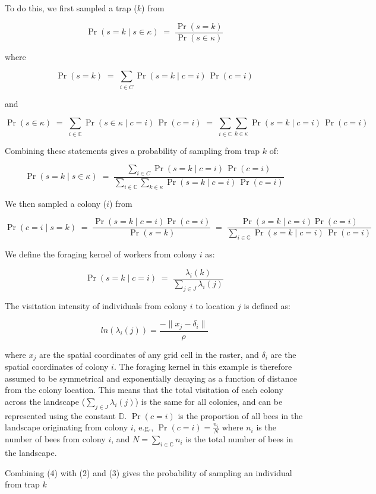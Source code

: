 \documentclass[12pt]{article}
\begin{document}
To do this, we first sampled a trap ($k$) from

\[
\Pr(s = k \mid s \in \kappa) \;=\; \frac{\Pr(s = k)}{\Pr(s \in \kappa)} \tag{1}
\]

where

\[
\Pr(s = k) \;=\; \sum_{i \in C} \Pr(s = k \mid c = i)\,\Pr(c = i)
\]

and

\[
\Pr(s \in \kappa) \;=\; \sum_{i \in \mathbb{C}} \Pr(s \in \kappa \mid c = i)\,\Pr(c = i)
                  \;=\; \sum_{i \in \mathbb{C}} \sum_{k \in \kappa} \Pr(s = k \mid c = i)\,\Pr(c = i)
\]

Combining these statements gives a probability of sampling from trap $k$ of:

\[
\Pr(s = k \mid s \in \kappa) \;=\; \frac{\sum_{i \in C} \Pr(s = k \mid c = i)\,\Pr(c = i)}{\sum_{i \in \mathbb{C}} \sum_{k \in \kappa} \Pr(s = k \mid c = i)\,\Pr(c = i)} \tag{2}
\]

We then sampled a colony ($i$) from

\[
\Pr(c = i \mid s = k) \;=\; \frac{\Pr(s = k \mid c = i) \Pr(c = i)}{\Pr(s = k)} \;=\; \frac{\Pr(s = k \mid c = i) \Pr(c = i)}{\sum_{i \in \mathbb{C}} \Pr(s = k \mid c = i)\,\Pr(c = i)} \tag{3}
\]


We define the foraging kernel of workers from colony $i$ as:

\[
\Pr(s = k \mid c = i)
\;=\; 
\frac{\lambda_i(k)}{\sum_{j \in J} \lambda_i(j)} \tag{4}
\]

The visitation intensity of individuals from colony $i$ to location $j$ is defined as: 

\[
ln(\lambda_i(j)) = \frac{- \lVert x_j - \delta_i \rVert}{\rho} \tag{5}
\]

where $x_j$ are the spatial coordinates of any grid cell in the raster, and $\delta_i$ are the spatial coordinates of colony $i$. The foraging kernel in this example is therefore assumed to be symmetrical and exponentially decaying as a function of distance from the colony location. This means that the total visitation of each colony across the landscape ($\sum_{j \in J} \lambda_i(j)$) is the same for all colonies, and can be represented using the constant $\mathbb{D}$. $\Pr(c = i)$ is the proportion of all bees in the landscape originating from colony $i$, e.g., $\Pr(c = i) = \frac{n_i}{N}$ where $n_i$ is the number of bees from colony $i$, and $N = \sum_{i \in \mathbb{C}} n_i$ is the total number of bees in the landscape.

Combining (4) with (2) and (3) gives the probability of sampling an individual from trap $k$
\end{document}
